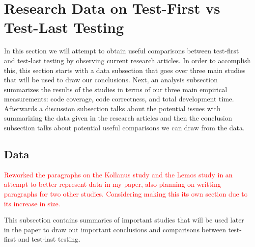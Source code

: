 \documentclass{sig-alternate}
\newcommand{\mycomment}[1]{\textcolor{red}{#1}}
\begin{document}
\section{Research Data on Test-First vs Test-Last Testing}
In this section we will attempt to obtain useful comparisons between test-first and test-last testing by observing current research articles.  In order to accomplish this, this section starts with a data subsection that goes over three main studies that will be used to draw our conclusions.  Next, an analysis subsection summarizes the results of the studies in terms of our three main empirical measurements: code coverage, code correctness, and total development time.  Afterwards a discussion subsection talks about the potential issues with summarizing the data given in the research articles and then the conclusion subsection talks about potential useful comparisons we can draw from the data. 

\subsection{Data}
\mycomment{Reworked the paragraphs on the Kollanus study and the Lemos study in an attempt to better represent data in my paper, also planning on writting paragraphs for two other studies.  Considering making this its own section due to its increase in size.}

This subsection contains summaries of important studies that will be used later in the paper to draw out important conclusions and comparisons between test-first and test-last testing.
\end{document}
